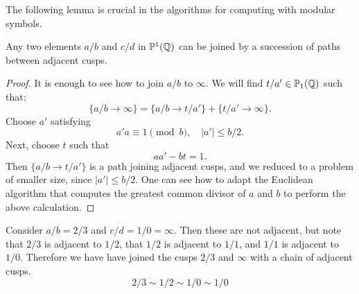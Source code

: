 The following lemma is crucial in the algorithms for computing with modular symbols.
\begin{lemma}
  Any two elements $a/b$ and $c/d$ in $\mathbb{P}^1(\mathbb{Q})$ can be joined by a succession of paths between adjacent cusps.
\end{lemma}
\begin{proof}
  It is enough to see how to join $a/b$ to $\infty$. We will find $t/a'\in\mathbb{P}_1(\mathbb{Q})$ such that:
\[
\{a/b\to \infty\} = \{a/b\to t/a'\}+\{t/a'\to \infty\}.
\]
Choose $a'$ satisfying
\[
a'a\equiv 1\pmod{b},\quad |a'|\leq b/2.
\]
Next, choose $t$ such that
\[
aa'-bt = 1.
\]
Then $\{a/b\to t/a'\}$ is a path joining adjacent cusps, and we reduced to a problem of smaller size, since $|a'|\leq b/2$. One can see how to adapt the Euclidean algorithm that computes the greatest common divisor of $a$ and $b$ to perform the above calculation.
\end{proof}

\begin{example}
  Consider $a/b = 2/3$ and $c/d = 1/0=\infty$. Then these are not adjacent, but note that $2/3$ is adjacent to $1/2$, that $1/2$ is adjacent to $1/1$, and $1/1$ is adjacent to $1/0$. Therefore we have have joined the cusps $2/3$ and $\infty$ with a chain of adjacent cusps.
\[
2/3\sim 1/2\sim 1/0 \sim 1/0
\]
\end{example}

